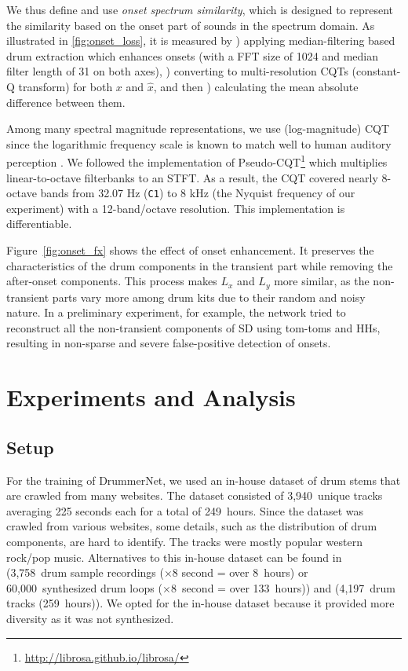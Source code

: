 \documentclass{article}
\newcommand{\smallsqueeze}{\vspace{-0.1cm}}
\begin{document}
	We thus define and use \textit{onset spectrum similarity}, which is designed to represent the similarity based on the onset part of sounds in the spectrum domain. As illustrated in \ref{fig:onset_loss}, it is measured by  ) applying median-filtering based drum extraction \cite{fitzgerald2010harmonic} which enhances onsets (with a FFT size of 1024 and median filter length of 31 on both axes), ) converting to multi-resolution CQTs (constant-Q transform) for both $x$ and $\hat{x}$, and then ) calculating the mean absolute difference between them.
	
	Among many spectral magnitude representations, we use (log-magnitude) CQT since the logarithmic frequency scale is known to match well to human auditory perception \cite{moore2012introduction}. We followed the implementation of Pseudo-CQT\footnote{
		\url{http://librosa.github.io/librosa/}
	} 
	which multiplies linear-to-octave filterbanks to an STFT. As a result, the CQT covered nearly 8-octave bands from 32.07 Hz (\texttt{C1}) to 8 kHz (the Nyquist frequency of our experiment) with a 12-band/octave resolution. This implementation is differentiable.
	
	Figure~\ref{fig:onset_fx} shows the effect of onset enhancement. It preserves the characteristics of the drum components in the transient part while removing the after-onset components. This process makes $L_x$ and $L_y$ more similar, as the non-transient parts vary more among drum kits due to their random and noisy nature. In a preliminary experiment, for example, the network tried to reconstruct all the non-transient components of SD using tom-toms and HHs, resulting in non-sparse and severe false-positive detection of onsets.
	
	\smallsqueeze
	\section{Experiments and Analysis} 
	\label{sec:experiment}
	\smallsqueeze
	\subsection{Setup}
	
	For the training of DrummerNet, we used an in-house dataset of drum stems that are crawled from many websites. The dataset consisted of 3,940~unique tracks averaging 225 seconds each for a total of 249~hours. Since the dataset was crawled from various websites, some details, such as the distribution of drum components, are hard to identify. The tracks were mostly popular western rock/pop music. Alternatives to this in-house dataset can be found in \cite{cartwright2018increasing} (3,758~drum sample recordings ($\times$8 second = over 8~hours) or 60,000~synthesized drum loops ($\times$8~second = over 133~hours)) and \cite{vogl2018towards} (4,197~drum tracks (259~hours)). We opted for the in-house dataset because it provided more diversity as it was not synthesized.
	
\end{document}
